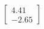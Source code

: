 \documentclass[preview]{standalone}
\begin{document}
\begin{align*}
\begin{bmatrix} 4.41 \\ -2.65 \end{bmatrix}
\end{align*}
\end{document}
